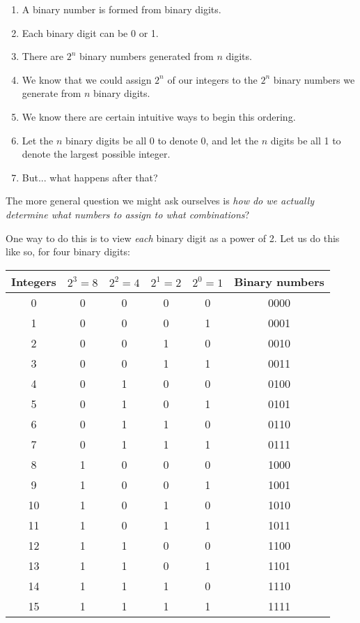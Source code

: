 \documentclass[12pt]{article}
\begin{document}
    \begin{enumerate}
        \item A binary number is formed from binary digits.
        \item Each binary digit can be 0 or 1.
        \item There are $2^n$ binary numbers generated from $n$ digits.
        \item We know that we could assign $2^n$ of our integers
        to the $2^n$ binary numbers we generate from $n$ binary digits.
        \item We know there are certain intuitive ways to begin this ordering.
        \item Let the $n$ binary digits be all 0 to denote 0, and let the $n$ digits be all 1 to denote the largest possible integer.
        \item But... what happens after that?
    \end{enumerate}

    The more general question we might ask ourselves is \textit{how do we actually determine what numbers to assign to what combinations}?

    One way to do this is to view \textit{each} binary digit as a power of 2. Let us do this like so, for four binary digits:

    \begin{center}
        \begin{tabular}{|c|c|c|c|c|c|}
          \hline
          Integers & $2^3 = 8$ & $2^2 = 4$ & $2^1 = 2$ & $2^0 = 1$ & Binary numbers \\
          \hline
          0 & 0 & 0 & 0 & 0 & 0000 \\
          1 & 0 & 0 & 0 & 1 & 0001 \\
          2 & 0 & 0 & 1 & 0 & 0010 \\
          3 & 0 & 0 & 1 & 1 & 0011 \\
          4 & 0 & 1 & 0 & 0 & 0100 \\
          5 & 0 & 1 & 0 & 1 & 0101 \\
          6 & 0 & 1 & 1 & 0 & 0110 \\         
          7 & 0 & 1 & 1 & 1 & 0111 \\
          8 & 1 & 0 & 0 & 0 & 1000 \\
          9 & 1 & 0 & 0 & 1 & 1001 \\
          10 & 1 & 0 & 1 & 0 & 1010 \\
          11 & 1 & 0 & 1 & 1 & 1011 \\
          12 & 1 & 1 & 0 & 0 & 1100 \\
          13 & 1 & 1 & 0 & 1 & 1101 \\
          14 & 1 & 1 & 1 & 0 & 1110 \\
          15 & 1 & 1 & 1 & 1 & 1111 \\
          \hline
        \end{tabular}
    \end{center}
\end{document}

